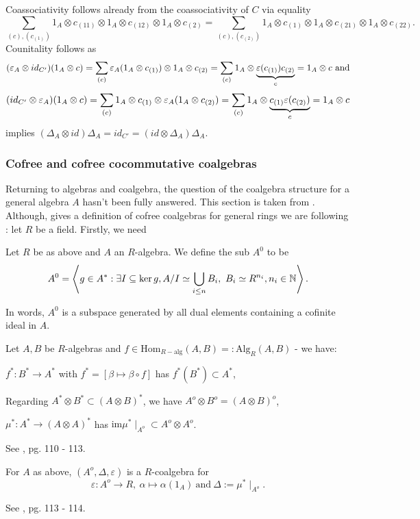 Coassociativity follows already from the coassociativity of $C$ via equality
$$\sum_{(c),(c_{(1)})} 1_A \otimes c_{(11)} \otimes 1_A \otimes c_{(12)} \otimes 1_A \otimes c_{(2)} = \sum_{(c),(c_{(2)})} 1_A \otimes c_{(1)} \otimes 1_A \otimes c_{(21)} \otimes 1_A \otimes c_{(22)}.$$
Counitality follows as
$$(\varepsilon_A \otimes id_{C'})(1_A \otimes c) = \sum_{(c)} \varepsilon_A(1_A \otimes c_{(1)}) \otimes 1_A \otimes c_{(2)} = \sum_{(c)} 1_A \otimes\underbrace{ \varepsilon(c_{(1)}) c_{(2)}}_{c} = 1_A \otimes c\ \mathrm{and}$$
$$(id_{C'} \otimes \varepsilon_A)(1_A \otimes c) = \sum_{(c)} 1_A \otimes c_{(1)} \otimes \varepsilon_A(1_A \otimes c_{(2)}) = \sum_{(c)} 1_A \otimes\underbrace{c_{(1)} \varepsilon(c_{(2)})}_{c} = 1_A \otimes c$$
implies $(\Delta_A \otimes id) \Delta_A = id_{C'} = (id \otimes \Delta_A)\Delta_A$.
\subsubsection{Cofree and cofree cocommutative coalgebras}
Returning to algebras and coalgebra, the question of the coalgebra structure for a general algebra $A$ hasn't been fully answered. This section is taken from \cite{Sweed}. Although, \cite{barr} gives a definition of cofree coalgebras for general rings we are following \cite{Sweed}: let $R$ be a field. Firstly, we need
\begin{defi}
Let $R$ be as above and $A$ an $R$-algebra. We define the sub $A^0$ to be
$$A^0 = \left<g \in A^\ast : \exists I \subseteq \ker g, A/I \simeq \bigcup_{i\leq n} B_i,\ B_i \simeq R^{n_i}, n_i \in \mathbb{N}\right>.$$
\end{defi}
In words, $A^0$ is a subspace generated by all dual elements containing a cofinite ideal in $A$.
\begin{lemm}
Let $A, B$ be $R$-algebras and $f \in \mathrm{Hom}_{R-\mathrm{alg}}(A,B) =: \mathrm{Alg}_R(A,B)$ - we have:
\bn
\item $f^\ast: B^\ast \longrightarrow  A^\ast$ with $f^\ast = [\beta \longmapsto \beta \circ f]$ has $f^\ast(B^\ast) \subset A^\ast$,
\item Regarding $A^\ast \otimes B^\ast \subset (A \otimes B)^\ast$, we have $A^o \otimes B^o = (A \otimes B)^o$,
\item $\mu^\ast : A^\ast \longrightarrow (A \otimes A)^\ast$ has $\mathrm{im} \mu^\ast\mid_{A^o} \subset A^o \otimes A^o$.
\en
\end{lemm}
\bws See \cite{Sweed}, pg. 110 - 113.
\begin{prop}
For $A$ as above, $(A^o, \Delta, \varepsilon)$ is a $R$-coalgebra for 
$$\varepsilon : A^o \longrightarrow R,\ \alpha \longmapsto \alpha(1_A)\ \mathrm{and}\ \Delta := \mu^\ast\mid_{A^o}.$$
\end{prop}
\bws See \cite{Sweed}, pg. 113 - 114.

